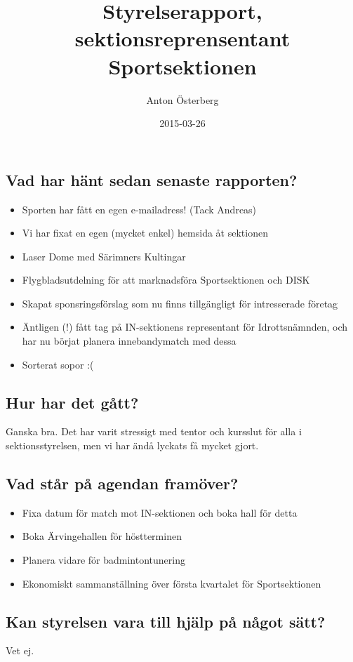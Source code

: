 \documentclass[a4paper]{article}
\begin{document}
	\title{\Huge Styrelserapport, sektionsreprensentant Sportsektionen}
	\author{Anton Österberg}
	\date{2015-03-26}
	\maketitle

	\null
	\vfill

	\clearpage

	\subsection{Vad har hänt sedan senaste rapporten?}
	\begin{itemize}
		\item Sporten har fått en egen e-mailadress! (Tack Andreas)
		\item Vi har fixat en egen (mycket enkel) hemsida åt sektionen
		\item Laser Dome med Särimners Kultingar
		\item Flygbladsutdelning för att marknadsföra Sportsektionen och DISK
		\item Skapat sponsringsförslag som nu finns tillgängligt för intresserade företag
		\item Äntligen (!) fått tag på IN-sektionens representant för
Idrottsnämnden, och har nu börjat planera innebandymatch med dessa
		\item Sorterat sopor :(
	\end{itemize}
	\subsection{Hur har det gått?}
	Ganska bra. Det har varit stressigt med tentor och kursslut för alla i
sektionsstyrelsen, men vi har ändå lyckats få mycket gjort.
	\subsection{Vad står på agendan framöver?}
	\begin{itemize}
		\item Fixa datum för match mot IN-sektionen och boka hall för detta
		\item Boka Ärvingehallen för höstterminen
		\item Planera vidare för badmintontunering
		\item Ekonomiskt sammanställning över första kvartalet för Sportsektionen
	\end{itemize}

	\subsection{Kan styrelsen vara till hjälp på något sätt?}
	Vet ej.
\end{document}
